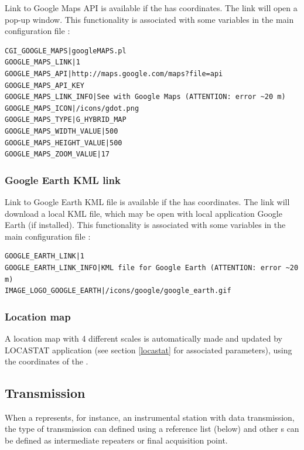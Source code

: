 Link to Google Maps API is available if the  has coordinates. The link will open a pop-up window. This functionality is associated with some variables in the main configuration file :

\begin{lstlisting}[title=\wofile{WEBOBS.rc} (excerpt)]
CGI_GOOGLE_MAPS|googleMAPS.pl
GOOGLE_MAPS_LINK|1
GOOGLE_MAPS_API|http://maps.google.com/maps?file=api
GOOGLE_MAPS_API_KEY
GOOGLE_MAPS_LINK_INFO|See with Google Maps (ATTENTION: error ~20 m)
GOOGLE_MAPS_ICON|/icons/gdot.png
GOOGLE_MAPS_TYPE|G_HYBRID_MAP
GOOGLE_MAPS_WIDTH_VALUE|500
GOOGLE_MAPS_HEIGHT_VALUE|500
GOOGLE_MAPS_ZOOM_VALUE|17
\end{lstlisting}

\subsubsection{Google Earth KML link}

Link to Google Earth KML file is available if the  has coordinates. The link will download a local KML file, which may be open with local application Google Earth (if installed). This functionality is associated with some variables in the main configuration file :

\begin{lstlisting}[title=\wofile{WEBOBS.rc} (excerpt)]
GOOGLE_EARTH_LINK|1
GOOGLE_EARTH_LINK_INFO|KML file for Google Earth (ATTENTION: error ~20 m)
IMAGE_LOGO_GOOGLE_EARTH|/icons/google/google_earth.gif
\end{lstlisting}

\subsubsection{Location map}

A location map with 4 different scales is automatically made and updated by LOCASTAT application (see section \ref{locastat} for associated parameters), using the coordinates of the .


\subsection{Transmission}

When a  represents, for instance, an instrumental station with data transmission, the type of transmission can defined using a reference list (below) and other s can be defined as intermediate repeaters or final acquisition point.

